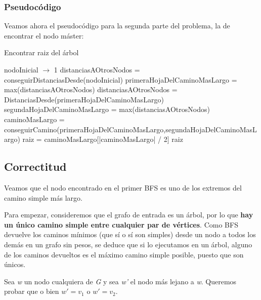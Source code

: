 \documentclass[a4paper]{report}
\begin{document}
\subsubsection{Pseudocódigo}
Veamos ahora el pseudocódigo para la segunda parte del problema, la de encontrar el nodo máster: 
\begin{algorithm}[H] \caption{Encontrar raiz del árbol}

    \begin{algorithmic}[1]
    
         
            
            \State nodoInicial $\rightarrow$ 1
            \State distanciasAOtrosNodos = conseguirDistanciasDesde(nodoInicial) 
            \State primeraHojaDelCaminoMasLargo = max(distanciasAOtrosNodos) 
            \State distanciasAOtrosNodos = 
            DistanciasDesde(primeraHojaDelCaminoMasLargo) 
            \State segundaHojaDelCaminoMasLargo = max(distanciasAOtrosNodos) 
            \State caminoMasLargo = conseguirCamino(primeraHojaDelCaminoMasLargo,segundaHojaDelCaminoMasLargo) 
            \State raiz = caminoMasLargo[|caminoMasLargo| / 2]
            \State \Return raiz
        \EndFunction

    
    \end{algorithmic}

\end{algorithm}

\subsection{Correctitud}

Veamos que el nodo encontrado en el primer BFS es uno de los extremos del camino simple más largo.

Para empezar, consideremos que el grafo de entrada es un árbol, por lo que \textbf{hay un único camino simple entre cualquier par de vértices}. Como BFS devuelve los caminos mínimos (que sí o sí son simples) desde un nodo a todos los demás en un grafo sin pesos, se deduce que si lo ejecutamos en un árbol, alguno de los caminos devueltos es el máximo camino simple posible, puesto que son únicos.

Sea \textit{w} un nodo cualquiera de \textit{G} y sea \textit{w'} el nodo más lejano a \textit{w}. Queremos probar que o bien $w' = v_{1}$ o $w' = v_{2}$.
\end{document}
